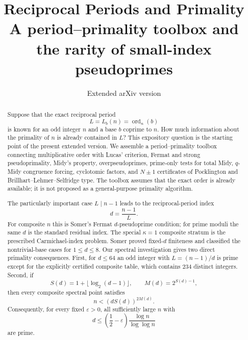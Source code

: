\documentclass[11pt]{article}
\title{\textbf{Reciprocal Periods and Primality}\\
\large A period--primality toolbox and the rarity of small-index pseudoprimes}
\author{Extended arXiv version}
\date{}
\newcommand{\ord}{\operatorname{ord}}
\begin{document}
\maketitle

\begin{abstract}
Suppose that the exact reciprocal period
\[
L=L_b(n)=\ord_n(b)
\]
is known for an odd integer $n$ and a base $b$ coprime to $n$.  How much
information about the primality of $n$ is already contained in $L$?  This
expository question is the starting point of the present extended version.  We
assemble a period--primality toolbox connecting multiplicative order with
Lucas' criterion, Fermat and strong pseudoprimality, Midy's property,
overpseudoprimes, prime-only tests for total Midy, $q$-Midy congruence
forcing, cyclotomic factors, and $N\pm1$ certificates of Pocklington and
Brillhart--Lehmer--Selfridge type.  The toolbox assumes that the exact order is
already available; it is not proposed as a general-purpose primality algorithm.

The particularly important case $L\mid n-1$ leads to the reciprocal-period
index
\[
d=\frac{n-1}{L}.
\]
For composite $n$ this is Somer's Fermat $d$-pseudoprime condition; for
prime moduli the same $d$ is the standard residual index.  The special
$\kappa=1$ composite stratum is the prescribed Carmichael-index problem.
Somer proved fixed-$d$ finiteness and classified the nontrivial-base cases for
$1\le d\le8$.  Our spectral investigation gives two direct primality
consequences.  First, for $d\le64$ an odd integer with
$L=(n-1)/d$ is prime except for the explicitly certified composite table,
which contains $234$ distinct integers.  Second, if
\[
S(d)=1+\lfloor\log_2(d-1)\rfloor,\qquad
M(d)=2^{S(d)-1},
\]
then every composite spectral point satisfies
\[
n<(dS(d))^{2M(d)}.
\]
Consequently, for every fixed $\varepsilon>0$, all sufficiently large $n$
with
\[
d\le\left(\frac12-\varepsilon\right)
       \frac{\log n}{\log\log n}
\]
are prime.


\end{abstract}
\end{document}
